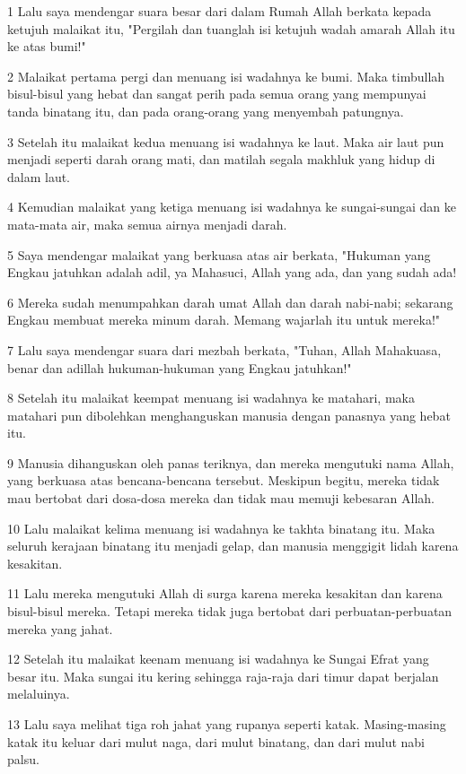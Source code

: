 \par 1 Lalu saya mendengar suara besar dari dalam Rumah Allah berkata kepada ketujuh malaikat itu, "Pergilah dan tuanglah isi ketujuh wadah amarah Allah itu ke atas bumi!"
\par 2 Malaikat pertama pergi dan menuang isi wadahnya ke bumi. Maka timbullah bisul-bisul yang hebat dan sangat perih pada semua orang yang mempunyai tanda binatang itu, dan pada orang-orang yang menyembah patungnya.
\par 3 Setelah itu malaikat kedua menuang isi wadahnya ke laut. Maka air laut pun menjadi seperti darah orang mati, dan matilah segala makhluk yang hidup di dalam laut.
\par 4 Kemudian malaikat yang ketiga menuang isi wadahnya ke sungai-sungai dan ke mata-mata air, maka semua airnya menjadi darah.
\par 5 Saya mendengar malaikat yang berkuasa atas air berkata, "Hukuman yang Engkau jatuhkan adalah adil, ya Mahasuci, Allah yang ada, dan yang sudah ada!
\par 6 Mereka sudah menumpahkan darah umat Allah dan darah nabi-nabi; sekarang Engkau membuat mereka minum darah. Memang wajarlah itu untuk mereka!"
\par 7 Lalu saya mendengar suara dari mezbah berkata, "Tuhan, Allah Mahakuasa, benar dan adillah hukuman-hukuman yang Engkau jatuhkan!"
\par 8 Setelah itu malaikat keempat menuang isi wadahnya ke matahari, maka matahari pun dibolehkan menghanguskan manusia dengan panasnya yang hebat itu.
\par 9 Manusia dihanguskan oleh panas teriknya, dan mereka mengutuki nama Allah, yang berkuasa atas bencana-bencana tersebut. Meskipun begitu, mereka tidak mau bertobat dari dosa-dosa mereka dan tidak mau memuji kebesaran Allah.
\par 10 Lalu malaikat kelima menuang isi wadahnya ke takhta binatang itu. Maka seluruh kerajaan binatang itu menjadi gelap, dan manusia menggigit lidah karena kesakitan.
\par 11 Lalu mereka mengutuki Allah di surga karena mereka kesakitan dan karena bisul-bisul mereka. Tetapi mereka tidak juga bertobat dari perbuatan-perbuatan mereka yang jahat.
\par 12 Setelah itu malaikat keenam menuang isi wadahnya ke Sungai Efrat yang besar itu. Maka sungai itu kering sehingga raja-raja dari timur dapat berjalan melaluinya.
\par 13 Lalu saya melihat tiga roh jahat yang rupanya seperti katak. Masing-masing katak itu keluar dari mulut naga, dari mulut binatang, dan dari mulut nabi palsu.
